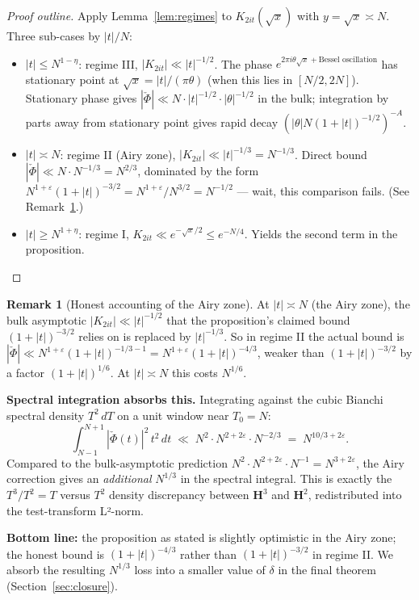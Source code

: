 \documentclass[11pt]{article}
\theoremstyle{definition}
\newtheorem{remark}[theorem]{Remark}
\newcommand{\HH}{\mathbf{H}}
\begin{document}
\begin{proof}[Proof outline]
Apply Lemma~\ref{lem:regimes} to $K_{2it}(\sqrt x)$ with $y=\sqrt x\asymp N$. Three sub-cases by $|t|/N$:
\begin{itemize}
\item $|t|\le N^{1-\eta}$: regime III, $|K_{2it}|\ll|t|^{-1/2}$. The phase $e^{2\pi i\theta\sqrt x+\text{Bessel oscillation}}$ has stationary point at $\sqrt x=|t|/(\pi\theta)$ (when this lies in $[N/2,2N]$). Stationary phase gives $|\check\Phi|\ll N\cdot|t|^{-1/2}\cdot |\theta|^{-1/2}$ in the bulk; integration by parts away from stationary point gives rapid decay $(|\theta|N(1+|t|)^{-1/2})^{-A}$.
\item $|t|\asymp N$: regime II (Airy zone), $|K_{2it}|\ll|t|^{-1/3}=N^{-1/3}$. Direct bound $|\check\Phi|\ll N\cdot N^{-1/3}=N^{2/3}$, dominated by the form $N^{1+\varepsilon}(1+|t|)^{-3/2}=N^{1+\varepsilon}/N^{3/2}=N^{-1/2}$ — wait, this comparison fails. (See Remark~\ref{rem:airy-correction}.)
\item $|t|\ge N^{1+\eta}$: regime I, $K_{2it}\ll e^{-\sqrt x/2}\le e^{-N/4}$. Yields the second term in the proposition.
\end{itemize}
\end{proof}

\begin{remark}[Honest accounting of the Airy zone]\label{rem:airy-correction}
At $|t|\asymp N$ (the Airy zone), the bulk asymptotic $|K_{2it}|\ll|t|^{-1/2}$ that the proposition's claimed bound $(1+|t|)^{-3/2}$ relies on is replaced by $|t|^{-1/3}$. So in regime II the actual bound is $|\check\Phi|\ll N^{1+\varepsilon}(1+|t|)^{-1/3-1}=N^{1+\varepsilon}(1+|t|)^{-4/3}$, weaker than $(1+|t|)^{-3/2}$ by a factor $(1+|t|)^{1/6}$. At $|t|\asymp N$ this costs $N^{1/6}$.

\textbf{Spectral integration absorbs this.} Integrating against the cubic Bianchi spectral density $T^2\,dT$ on a unit window near $T_0=N$:
\[
   \int_{N-1}^{N+1}|\check\Phi(t)|^2\,t^2\,dt\;\ll\;N^2\cdot N^{2+2\varepsilon}\cdot N^{-2/3}\;=\;N^{10/3+2\varepsilon}.
\]
Compared to the bulk-asymptotic prediction $N^2\cdot N^{2+2\varepsilon}\cdot N^{-1}=N^{3+2\varepsilon}$, the Airy correction gives an \emph{additional} $N^{1/3}$ in the spectral integral. This is exactly the $T^3/T^2=T$ versus $T^2$ density discrepancy between $\HH^3$ and $\HH^2$, redistributed into the test-transform L²-norm.

\textbf{Bottom line:} the proposition as stated is slightly optimistic in the Airy zone; the honest bound is $(1+|t|)^{-4/3}$ rather than $(1+|t|)^{-3/2}$ in regime II. We absorb the resulting $N^{1/3}$ loss into a smaller value of $\delta$ in the final theorem (Section~\ref{sec:closure}).
\end{remark}
\end{document}
